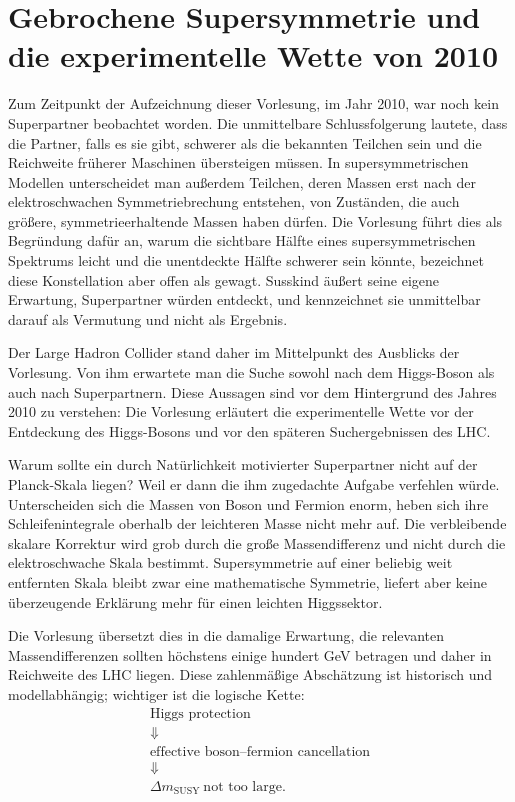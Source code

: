 \section{Gebrochene Supersymmetrie und die experimentelle Wette von 2010}

Zum Zeitpunkt der Aufzeichnung dieser Vorlesung, im Jahr 2010, war noch kein Superpartner beobachtet worden. Die unmittelbare Schlussfolgerung lautete, dass die Partner, falls es sie gibt, schwerer als die bekannten Teilchen sein und die Reichweite früherer Maschinen übersteigen müssen. In supersymmetrischen Modellen unterscheidet man außerdem Teilchen, deren Massen erst nach der elektroschwachen Symmetriebrechung entstehen, von Zuständen, die auch größere, symmetrieerhaltende Massen haben dürfen. Die Vorlesung führt dies als Begründung dafür an, warum die sichtbare Hälfte eines supersymmetrischen Spektrums leicht und die unentdeckte Hälfte schwerer sein könnte, bezeichnet diese Konstellation aber offen als gewagt. Susskind äußert seine eigene Erwartung, Superpartner würden entdeckt, und kennzeichnet sie unmittelbar darauf als Vermutung und nicht als Ergebnis.

Der Large Hadron Collider stand daher im Mittelpunkt des Ausblicks der Vorlesung. Von ihm erwartete man die Suche sowohl nach dem Higgs-Boson als auch nach Superpartnern. Diese Aussagen sind vor dem Hintergrund des Jahres 2010 zu verstehen: Die Vorlesung erläutert die experimentelle Wette vor der Entdeckung des Higgs-Bosons und vor den späteren Suchergebnissen des LHC.

Warum sollte ein durch Natürlichkeit motivierter Superpartner nicht auf der Planck-Skala liegen? Weil er dann die ihm zugedachte Aufgabe verfehlen würde. Unterscheiden sich die Massen von Boson und Fermion enorm, heben sich ihre Schleifenintegrale oberhalb der leichteren Masse nicht mehr auf. Die verbleibende skalare Korrektur wird grob durch die große Massendifferenz und nicht durch die elektroschwache Skala bestimmt. Supersymmetrie auf einer beliebig weit entfernten Skala bleibt zwar eine mathematische Symmetrie, liefert aber keine überzeugende Erklärung mehr für einen leichten Higgssektor.

Die Vorlesung übersetzt dies in die damalige Erwartung, die relevanten Massendifferenzen sollten höchstens einige hundert GeV betragen und daher in Reichweite des LHC liegen. Diese zahlenmäßige Abschätzung ist historisch und modellabhängig; wichtiger ist die logische Kette:
\begin{equation}
\begin{gathered}
\text{Higgs protection}\\
\Downarrow\\
\text{effective boson--fermion cancellation}\\
\Downarrow\\
\Delta m_{\mathrm{SUSY}}\ \text{not too large}.
\end{gathered}
\end{equation}

